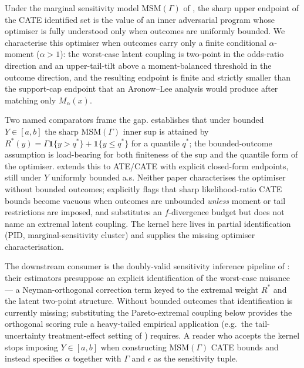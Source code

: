 \documentclass[11pt]{article}
\theoremstyle{definition}
\theoremstyle{plain}
\theoremstyle{remark}
\begin{document}
Under the marginal sensitivity model MSM$(\Gamma)$ of \citet{Tan2006}, the sharp upper endpoint of the CATE identified set is the value of an inner adversarial program whose optimiser is fully understood only when outcomes are uniformly bounded. We characterise this optimiser when outcomes carry only a finite conditional $\alpha$-moment ($\alpha > 1$): the worst-case latent coupling is two-point in the odds-ratio direction and an upper-tail-tilt above a moment-balanced threshold in the outcome direction, and the resulting endpoint is finite and strictly smaller than the support-cap endpoint that an Aronow--Lee analysis would produce after matching only $M_\alpha(x)$.

Two named comparators frame the gap. \citet[Theorem 3.1, eq.~(7)]{KallusMaoZhou2019} establishes that under bounded $Y \in [a,b]$ the sharp MSM$(\Gamma)$ inner sup is attained by $R^*(y) = \Gamma \mathbf{1}\{y > q^*\} + \mathbf{1}\{y \le q^*\}$ for a quantile $q^*$; the bounded-outcome assumption is load-bearing for both finiteness of the sup and the quantile form of the optimiser. \citet[Theorem~1 and Cor.~3]{YadlowskyNamkoongBasuDuchiTian2022} extends this to ATE/CATE with explicit closed-form endpoints, still under $Y$ uniformly bounded a.s. Neither paper characterises the optimiser without bounded outcomes; \citet[Sec.~3.1]{AsiaeePalBeckHuling2026} explicitly flags that sharp likelihood-ratio CATE bounds become vacuous when outcomes are unbounded \emph{unless} moment or tail restrictions are imposed, and \citet[Theorem~4.2]{JungKang2026} substitutes an $f$-divergence budget but does not name an extremal latent coupling. The kernel here lives in partial identification (PID, marginal-sensitivity cluster) and supplies the missing optimiser characterisation.

The downstream consumer is the doubly-valid sensitivity inference pipeline of \citet{DornGuoKallus2025}: their estimators presuppose an explicit identification of the worst-case nuisance --- a Neyman-orthogonal correction term keyed to the extremal weight $R^*$ and the latent two-point structure. Without bounded outcomes that identification is currently missing; substituting the Pareto-extremal coupling below provides the orthogonal scoring rule a heavy-tailed empirical application (e.g.\ the tail-uncertainty treatment-effect setting of \citealp{LordanSalehzadehNobari2026}) requires. A reader who accepts the kernel stops imposing $Y \in [a,b]$ when constructing MSM$(\Gamma)$ CATE bounds and instead specifies $\alpha$ together with $\Gamma$ and $\epsilon$ as the sensitivity tuple.
\end{document}
